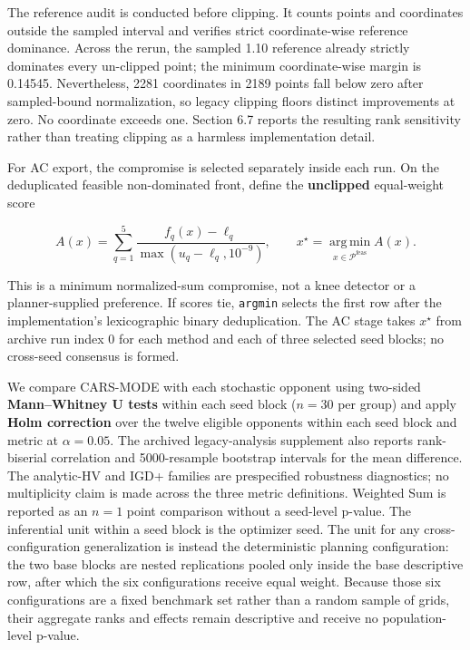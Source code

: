 \documentclass[energies,article,submit,moreauthors]{Definitions/mdpi}
\begin{document}
The reference audit is conducted before clipping. It counts points and coordinates outside the sampled interval and verifies strict coordinate-wise reference dominance. Across the rerun, the sampled 1.10 reference already strictly dominates every un-clipped point; the minimum coordinate-wise margin is 0.14545. Nevertheless, 2281 coordinates in 2189 points fall below zero after sampled-bound normalization, so legacy clipping floors distinct improvements at zero. No coordinate exceeds one. Section 6.7 reports the resulting rank sensitivity rather than treating clipping as a harmless implementation detail.

For AC export, the compromise is selected separately inside each run. On the deduplicated feasible non-dominated front, define the \textbf{unclipped} equal-weight score

\[
A(x)=\sum_{q=1}^{5}\frac{f_q(x)-\ell_q}{\max(u_q-\ell_q,10^{-9})},\qquad
x^{\star}=\operatorname*{arg\,min}_{x\in\mathcal P^{\mathrm{feas}}}A(x).
\]

This is a minimum normalized-sum compromise, not a knee detector or a planner-supplied preference. If scores tie, \texttt{argmin} selects the first row after the implementation's lexicographic binary deduplication. The AC stage takes \(x^{\star}\) from archive run index 0 for each method and each of three selected seed blocks; no cross-seed consensus is formed.

We compare CARS-MODE with each stochastic opponent using two-sided \textbf{Mann--Whitney U tests} within each seed block (\(n = 30\) per group) and apply \textbf{Holm correction} over the twelve eligible opponents within each seed block and metric \cite{ref32} at \(\alpha = 0.05\). The archived legacy-analysis supplement also reports rank-biserial correlation and 5000-resample bootstrap intervals for the mean difference. The analytic-HV and IGD+ families are prespecified robustness diagnostics; no multiplicity claim is made across the three metric definitions. Weighted Sum is reported as an \(n=1\) point comparison without a seed-level p-value. The inferential unit within a seed block is the optimizer seed. The unit for any cross-configuration generalization is instead the deterministic planning configuration: the two base blocks are nested replications pooled only inside the base descriptive row, after which the six configurations receive equal weight. Because those six configurations are a fixed benchmark set rather than a random sample of grids, their aggregate ranks and effects remain descriptive and receive no population-level p-value.
\end{document}
